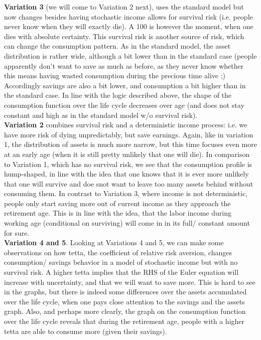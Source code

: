 \documentclass[12pt,a4paper]{article}
\begin{document}
\textbf{Variation 3} (we will come to Variation 2 next), uses the standard model but now changes besides having stochastic income allows for survival risk (i.e. people never know when they will exactly die). A 100 is however the moment, when one dies with absolute certainty. This survival risk is another source of risk, which can change the consumption pattern. As in the standard model, the asset distribution is rather wide, although a bit lower than in the standard case (people apparently don't want to save as much as before, as they never know whether this means having wasted consumption during the precious time alive ;) Accordingly savings are also a bit lower, and consumption a bit higher than in the standard case. In line with the logic described above, the shape of the consumption function over the life cycle decreases over age (and does not stay constant and high as in the standard model w/o survival risk). \\

\textbf{Variation 2} combines survival risk and a deterministic income process: i.e. we have more risk of dying unpredictably, but save earnings. Again, like in variation 1, the distribution of assets is much more narrow, but this time focuses even more at an early age (when it is still pretty unlikely that one will die).  In comparison to Variation 1, which has no survival risk, we see that the consumption profile is hump-shaped, in line with the idea that one knows that it is ever more unlikely that one will survive and doe snot want to leave too many assets behind without consuming them. In contrast to Variation 3, where income is not deterministic, people only start saving more out of current income as they approach the retirement age. This is in line with the idea, that the labor income during working age (conditional on surviving) will come in in its full/ constant amount for sure.\\

\textbf{Variation 4 and 5}. Looking at Variations 4 and 5, we can make some observations on how tetta, the coefficient of relative risk aversion, changes consumption/ savings behavior in a model of stochastic income but with no survival risk. A higher tetta implies that the RHS of the Euler equation will increase with uncertainty, and that we will want to save more. This is hard to see in the graphs, but there is indeed some differences over the assets accumulated over the life cycle, when one pays close attention to the savings and the assets graph. Also, and perhaps more clearly, the graph on the consumption function over the life cycle reveals that during the retirement age, people with a higher tetta are able to consume more (given their savings).\\
\end{document}
